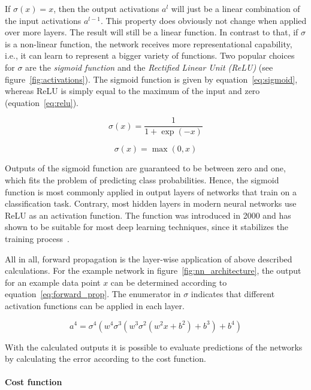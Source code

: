 If $\sigma(x) = x$, then the output activations $a^l$ will just be a linear
combination of the input activations $a^{l-1}$.
This property does obviously not change when applied over more layers.
The result will still be a linear function.
In contrast to that, if $\sigma$ is a non-linear function, the network receives more 
representational capability, i.e., it can learn to represent a bigger variety of 
functions. 
Two popular choices for $\sigma$ are the \textit{sigmoid function} and the
\textit{Rectified Linear Unit (ReLU)} (see figure~\ref{fig:activations}). 
The sigmoid function is given by equation~\ref{eq:sigmoid}, whereas ReLU is 
simply equal to the maximum of the input and zero (equation~\ref{eq:relu}).

\begin{equation}
  \label{eq:sigmoid}
  \sigma(x) = \frac{1}{1 + \exp(-x)}
\end{equation}

\begin{equation}
  \label{eq:relu}
  \sigma(x) = \max(0, x)
\end{equation}

Outputs of the sigmoid function are guaranteed to be between zero and one, which fits
the problem of predicting class probabilities.
Hence, the sigmoid function is most commonly applied in output layers of networks that
train on a classification task.
Contrary, most hidden layers in modern neural networks use ReLU as an activation
function.
The function was introduced in 2000 and has shown to be suitable for most deep
learning techniques, since it stabilizes the training process~\cite{Hahnioser2000, Nair2010}.

All in all, forward propagation is the layer-wise application of above described
calculations. For the example network in figure~\ref{fig:nn_architecture}, the
output for an example data point $x$ can be determined according to equation~\ref{eq:forward_prop}.
The enumerator in $\sigma$ indicates that different activation functions can
be applied in each layer.

\begin{equation}
  \label{eq:forward_prop}
  a^4 = \sigma^4(w^4 \sigma^3(w^3 \sigma^2(w^2 x + b^2) + b^3) + b^4)
\end{equation}

With the calculated outputs it is possible to evaluate predictions of the
networks by calculating the error according to the cost function.

\paragraph{Cost function}

